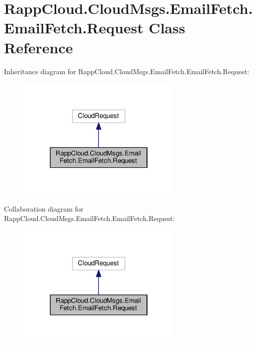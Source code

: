 \hypertarget{classRappCloud_1_1CloudMsgs_1_1EmailFetch_1_1EmailFetch_1_1Request}{\section{Rapp\-Cloud.\-Cloud\-Msgs.\-Email\-Fetch.\-Email\-Fetch.\-Request Class Reference}
\label{classRappCloud_1_1CloudMsgs_1_1EmailFetch_1_1EmailFetch_1_1Request}
}


Inheritance diagram for Rapp\-Cloud.\-Cloud\-Msgs.\-Email\-Fetch.\-Email\-Fetch.\-Request\-:
\nopagebreak
\begin{figure}[H]
\begin{center}
\leavevmode
\includegraphics[width=226pt]{classRappCloud_1_1CloudMsgs_1_1EmailFetch_1_1EmailFetch_1_1Request__inherit__graph}
\end{center}
\end{figure}


Collaboration diagram for Rapp\-Cloud.\-Cloud\-Msgs.\-Email\-Fetch.\-Email\-Fetch.\-Request\-:
\nopagebreak
\begin{figure}[H]
\begin{center}
\leavevmode
\includegraphics[width=226pt]{classRappCloud_1_1CloudMsgs_1_1EmailFetch_1_1EmailFetch_1_1Request__coll__graph}
\end{center}
\end{figure}
